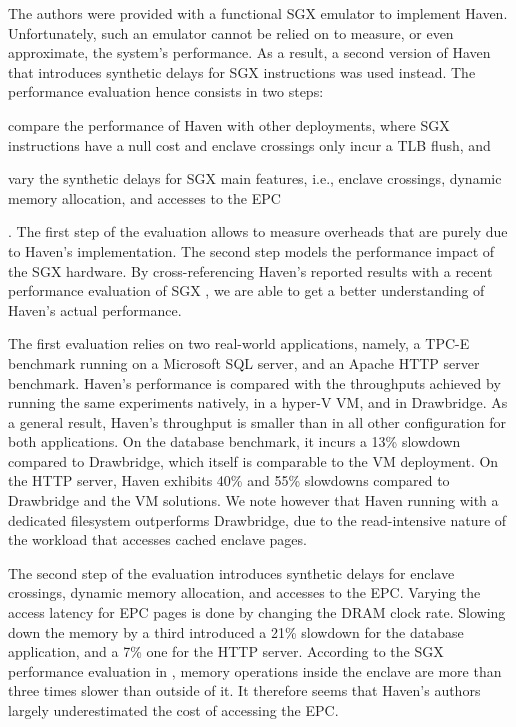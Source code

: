 The authors were provided with a functional SGX emulator to implement Haven.
Unfortunately, such an emulator cannot be relied on to measure, or even approximate, the system's performance.
As a result, a second version of Haven that introduces synthetic delays for SGX instructions was used instead.
The performance evaluation hence consists in two steps:
\begin{enumerate*}
	\item compare the performance of Haven with other deployments, where SGX instructions have a null cost and enclave crossings only incur a TLB flush, and
	\item vary the synthetic delays for SGX main features, i.e., enclave crossings, dynamic memory allocation, and accesses to the EPC
\end{enumerate*}.
The first step of the evaluation allows to measure overheads that are purely due to Haven's implementation.
The second step models the performance impact of the SGX hardware.
By cross-referencing Haven's reported results with a recent performance evaluation of SGX \cite{DBLP:conf/IEEEwisa/ZhaoSTZX16}, we are able to get a better understanding of Haven's actual performance.

The first evaluation relies on two real-world applications, namely, a TPC-E benchmark running on a Microsoft SQL server, and an Apache HTTP server benchmark.
Haven's performance is compared with the throughputs achieved by running the same experiments natively, in a hyper-V VM, and in Drawbridge.
As a general result, Haven's throughput is smaller than in all other configuration for both applications.
On the database benchmark, it incurs a 13\% slowdown compared to Drawbridge, which itself is comparable to the VM deployment.
On the HTTP server, Haven exhibits 40\% and 55\% slowdowns compared to Drawbridge and the VM solutions.
We note however that Haven running with a dedicated filesystem outperforms Drawbridge, due to the read-intensive nature of the workload that accesses cached enclave pages.

The second step of the evaluation introduces synthetic delays for enclave crossings, dynamic memory allocation, and accesses to the EPC.
Varying the access latency for EPC pages is done by changing the DRAM clock rate.
Slowing down the memory by a third introduced a 21\% slowdown for the database application, and a 7\% one for the HTTP server.
According to the SGX performance evaluation in \cite{DBLP:conf/IEEEwisa/ZhaoSTZX16}, memory operations inside the enclave are more than three times slower than outside of it.
It therefore seems that Haven's authors largely underestimated the cost of accessing the EPC.

